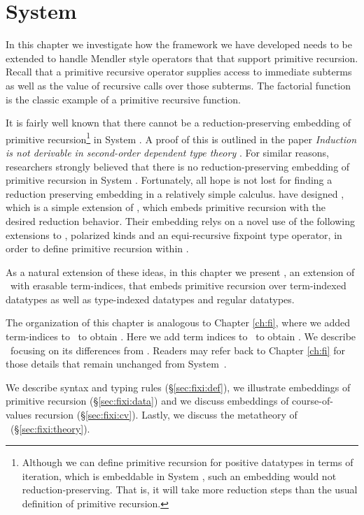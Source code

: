 \chapter{System \Fixi}\label{ch:fixi}

In this chapter we investigate how the framework we have developed needs to be extended
to handle Mendler style operators that that support primitive recursion. Recall that
a primitive recursive operator supplies access to immediate subterms as well as the
value of recursive calls over those subterms. The factorial function is the
classic example of a primitive recursive function.



It is fairly well known that there cannot be a reduction-preserving embedding of
primitive recursion\footnote{
	Although we can define primitive recursion for positive datatypes
	in terms of iteration, which is embeddable in System \F, such an
	embedding would not reduction-preserving. That is, it will take
	more reduction steps than the usual definition of primitive recursion.
	}
in System \F. A proof of this is outlined in the paper 
{\it Induction is not derivable in second-order dependent type theory}
\cite{Geuvers01}. For similar reasons, researchers strongly believed that
there is no reduction-preserving embedding of primitive recursion 
in System \Fw. Fortunately, all hope is not lost
for finding a reduction preserving embedding in a relatively simple calculus. 
\citet{AbeMat04} have designed \Fixw, which is a simple extension of \Fw,
which embeds primitive recursion with the desired reduction behavior.
Their embedding relys on a novel use of the following extensions to \Fw,
polarized kinds and an equi-recursive fixpoint type operator,
in order to define primitive recursion within \Fixw.

As a natural extension of these ideas, in this chapter we present \Fixi,
an extension of \Fixw\ with erasable term-indices,
that embeds primitive recursion over term-indexed datatypes
as well as type-indexed datatypes and regular datatypes.

The organization of this chapter is analogous to Chapter \ref{ch:fi}, 
where we added term-indices to \Fw\ to obtain \Fi. Here
we add term indices to \Fixw\ to obtain \Fixi. We describe \Fixi\ focusing on
its differences from \Fi. Readers may refer back to Chapter \ref{ch:fi} for
those details that remain unchanged from System~\Fi.

We describe syntax and typing rules (\S\ref{sec:fixi:def}),
we illustrate embeddings of primitive recursion (\S\ref{sec:fixi:data})
and we discuss embeddings of course-of-values recursion
(\S\ref{sec:fixi:cv}). Lastly, we
discuss the metatheory of \Fixi\ (\S\ref{sec:fixi:theory}).





